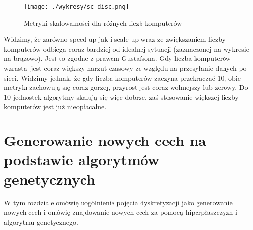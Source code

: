 \documentclass[magisterska]{pracamgr}
\theoremstyle{plain}
\theoremstyle{definition}
\theoremstyle{remark}
\begin{document}
\begin{figure}
 \caption{Metryki skalowalności dla różnych liczb komputerów}
 \centering\texttt{[image: ./wykresy/sc\_disc.png]}
\end{figure}

Widzimy, że zarówno speed-up jak i scale-up wraz ze zwiększaniem liczby komputerów odbiega coraz bardziej od idealnej sytuacji 
(zaznaczonej na wykresie na brązowo). Jest to zgodne z prawem Gustafsona. Gdy liczba komputerów wzrasta, jest coraz większy narzut czasowy
ze względu na przesyłanie danych po sieci. Widzimy jednak, że gdy liczba komputerów zaczyna przekraczać 10, obie 
metryki zachowują się coraz gorzej, przyrost jest coraz wolniejszy lub zerowy. Do 10 jednostek algorytmy skalują się więc dobrze, 
zaś stosowanie większej liczby komputerów jest już nieopłacalne.



\chapter{Generowanie nowych cech na podstawie algorytmów genetycznych}

W tym rozdziale omówię uogólnienie pojęcia dyskretyzacji jako generowanie nowych cech i omówię
znajdowanie nowych cech za pomocą hiperpłaszczyzn i algorytmu genetycznego.
\end{document}
